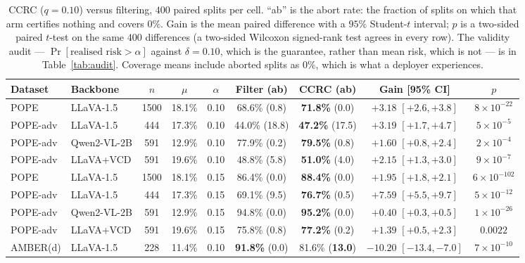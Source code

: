 \documentclass{article}
\theoremstyle{plain}
\theoremstyle{definition}
\theoremstyle{remark}
\begin{document}
\begin{table}[t]
\centering
\begin{threeparttable}
\caption{CCRC ($q{=}0.10$) versus filtering, $400$ paired splits per cell. ``ab'' is the abort
rate: the fraction of splits on which that arm certifies nothing and covers $0\%$. Gain is the
mean paired difference with a $95\%$ Student-$t$ interval; $p$ is a two-sided paired $t$-test on
the same $400$ differences (a two-sided Wilcoxon signed-rank test agrees in every row). The
validity audit --- $\Pr[\text{realised risk}>\alpha]$ against $\delta=0.10$, which is the
guarantee, rather than mean risk, which is not --- is in Table~\ref{tab:audit}. Coverage means
include aborted splits as $0\%$, which is what a deployer experiences.}
\label{tab:ccrc}
\footnotesize
\begin{tabular}{llccccccc}
\toprule
Dataset & Backbone & $n$ & $\mu$ & $\alpha$ & Filter (ab) & CCRC (ab) & Gain [95\% CI] & $p$\\
\midrule
POPE     & LLaVA-1.5   & 1500 & 18.1\% & 0.10 & 68.6\% (0.8) & \textbf{71.8\%} (0.0) & $+3.18$ $[+2.6,+3.8]$ & $8\!\times\!10^{-22}$\\
POPE-adv & LLaVA-1.5   & 444  & 17.3\% & 0.10 & 44.0\% (18.8) & \textbf{47.2\%} (17.5) & $+3.19$ $[+1.7,+4.7]$ & $5\!\times\!10^{-5}$\\
POPE-adv & Qwen2-VL-2B & 591  & 12.9\% & 0.10 & 77.9\% (0.2) & \textbf{79.5\%} (0.8) & $+1.60$ $[+0.8,+2.4]$ & $2\!\times\!10^{-4}$\\
POPE-adv & LLaVA+VCD   & 591  & 19.6\% & 0.10 & 48.8\% (5.8) & \textbf{51.0\%} (4.0) & $+2.15$ $[+1.3,+3.0]$ & $9\!\times\!10^{-7}$\\
\midrule
POPE     & LLaVA-1.5   & 1500 & 18.1\% & 0.15 & 86.4\% (0.0) & \textbf{88.4\%} (0.0) & $+1.95$ $[+1.8,+2.1]$ & $6\!\times\!10^{-102}$\\
POPE-adv & LLaVA-1.5   & 444  & 17.3\% & 0.15 & 69.1\% (9.5) & \textbf{76.7\%} (0.5) & $+7.59$ $[+5.5,+9.7]$ & $5\!\times\!10^{-12}$\\
POPE-adv & Qwen2-VL-2B & 591  & 12.9\% & 0.15 & 94.8\% (0.0) & \textbf{95.2\%} (0.0) & $+0.40$ $[+0.3,+0.5]$ & $1\!\times\!10^{-26}$\\
POPE-adv & LLaVA+VCD   & 591  & 19.6\% & 0.15 & 75.8\% (0.8) & \textbf{77.2\%} (0.2) & $+1.39$ $[+0.5,+2.3]$ & $0.0022$\\
\midrule
AMBER(d) & LLaVA-1.5   & 228  & 11.4\% & 0.10 & \textbf{91.8\%} (0.0) & 81.6\% (\textbf{13.0}) & $-10.20$ $[-13.4,-7.0]$ & $7\!\times\!10^{-10}$\\

\end{tabular}
\end{threeparttable}
\end{table}
\end{document}
